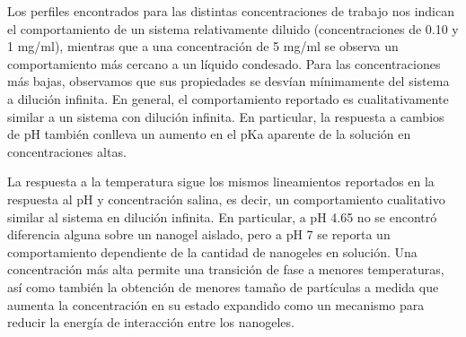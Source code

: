 	Los perfiles encontrados para las distintas concentraciones de trabajo nos indican el comportamiento de un sistema relativamente diluido (concentraciones de 0.10 y 1 mg/ml), mientras que a una concentraci\'on de 5 mg/ml se observa un comportamiento m\'as cercano a un l\'iquido condesado. Para las concentraciones m\'as bajas, observamos que sus propiedades se desv\'ian m\'inimamente del sistema a diluci\'on infinita. 
	 En general, el comportamiento reportado es cualitativamente similar a un sistema con diluci\'on infinita. En particular, la respuesta a cambios de pH tambi\'en conlleva un aumento en el pKa aparente de la soluci\'on en concentraciones altas.
	
	La respuesta a la temperatura sigue los mismos lineamientos reportados en la respuesta al pH y concentraci\'on salina, es decir, un comportamiento cualitativo similar al sistema en diluci\'on infinita. En particular, a pH 4.65 no se encontr\'o diferencia alguna sobre un nanogel aislado, pero a pH 7 se reporta un comportamiento dependiente de la cantidad de nanogeles en soluci\'on. Una concentraci\'on m\'as alta permite una transici\'on de fase a menores temperaturas, as\'i como tambi\'en la obtenci\'on de menores tama\~no de part\'iculas a medida que aumenta la concentraci\'on en su estado expandido como un mecanismo para reducir la energ\'ia de interacci\'on entre los nanogeles.
	
	

	
	
	